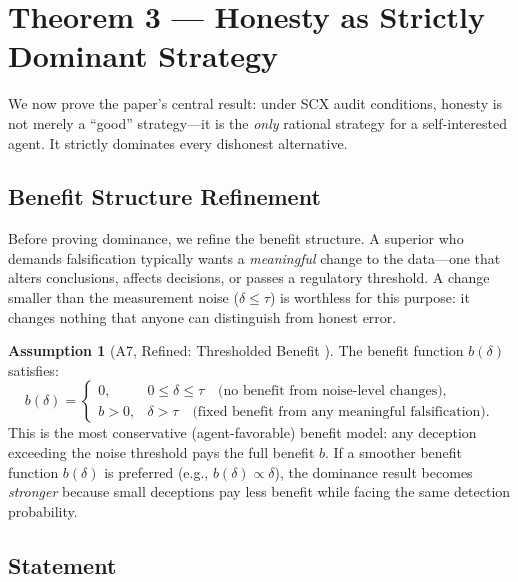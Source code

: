 \documentclass[11pt,a4paper]{article}
\theoremstyle{definition}
\newtheorem{assumption}[theorem]{Assumption}
\theoremstyle{remark}
\newcommand{\SCX}{\textsc{SCX}}
\newcommand{\deception}{\delta}
\newcommand{\threshold}{\tau}
\newcommand{\benefit}{b}
\begin{document}
\section{Theorem 3 --- Honesty as Strictly Dominant Strategy }
\label{sec:thm3}

We now prove the paper's central result: under \SCX{} audit conditions, honesty is not merely a ``good'' strategy---it is the \emph{only} rational strategy for a self-interested agent. It strictly dominates every dishonest alternative.

\subsection{Benefit Structure Refinement }

Before proving dominance, we refine the benefit structure. A superior who demands falsification typically wants a \emph{meaningful} change to the data---one that alters conclusions, affects decisions, or passes a regulatory threshold. A change smaller than the measurement noise ($\deception \leq \threshold$) is worthless for this purpose: it changes nothing that anyone can distinguish from honest error.

\begin{assumption}[A7, Refined: Thresholded Benefit ]
\label{ass:A7}
The benefit function $\benefit(\deception)$ satisfies:
\begin{equation}
    \benefit(\deception) = \begin{cases}
        0, & 0 \leq \deception \leq \threshold \quad \text{(no benefit from noise-level changes)}, \\
        b > 0, & \deception > \threshold \quad \text{(fixed benefit from any meaningful falsification)}.
    \end{cases}
\end{equation}
This is the most conservative (agent-favorable) benefit model: any deception exceeding the noise threshold pays the full benefit $b$. If a smoother benefit function $\benefit(\deception)$ is preferred (e.g., $\benefit(\deception) \propto \deception$), the dominance result becomes \emph{stronger} because small deceptions pay less benefit while facing the same detection probability.
\end{assumption}

\subsection{Statement}
\end{document}
